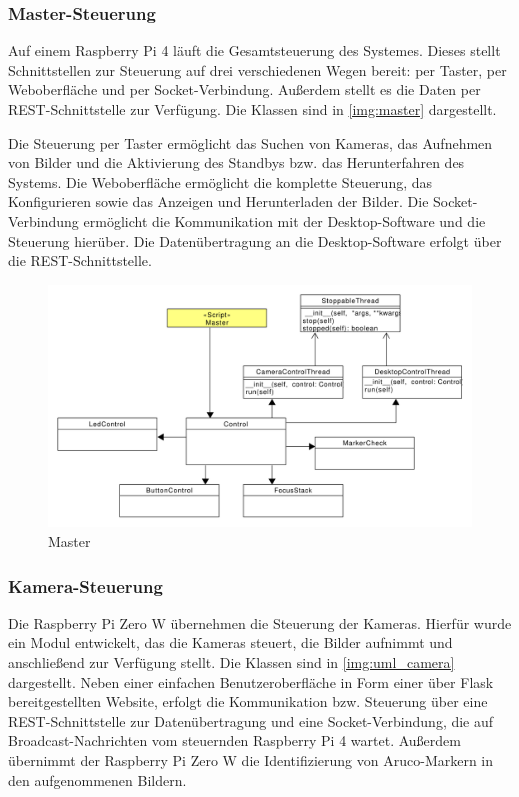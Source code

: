 \documentclass[./00PhotoBox.tex]{subfiles}
\begin{document}
\subsubsection{Master-Steuerung}

Auf einem Raspberry Pi 4 läuft die Gesamtsteuerung des Systemes. Dieses stellt Schnittstellen zur Steuerung auf drei verschiedenen Wegen bereit: per Taster, per Weboberfläche und per Socket-Verbindung. Außerdem stellt es die Daten per REST-Schnittstelle zur Verfügung. Die Klassen sind in \autoref{img:master} dargestellt.

Die Steuerung per Taster ermöglicht das Suchen von Kameras, das Aufnehmen von Bilder und die Aktivierung des Standbys bzw. das Herunterfahren des Systems. Die Weboberfläche ermöglicht die komplette Steuerung, das Konfigurieren sowie das Anzeigen und Herunterladen der Bilder. Die Socket-Verbindung ermöglicht die Kommunikation mit der Desktop-Software und die Steuerung hierüber. Die Datenübertragung an die Desktop-Software erfolgt über die REST-Schnittstelle.

\begin{figure}
    \centering
    \includegraphics[width=1\textwidth]{./img/uml/uml_master_classdiagramm.pdf}
    \centering
    \caption{Master} %
    \label{img:master} %
\end{figure}


\subsubsection{Kamera-Steuerung}
Die Raspberry Pi Zero W übernehmen die Steuerung der Kameras. Hierfür wurde ein Modul entwickelt, das die Kameras steuert, die Bilder aufnimmt und anschließend zur Verfügung stellt. Die Klassen sind in \autoref{img:uml_camera} dargestellt. Neben einer einfachen Benutzeroberfläche in Form einer über Flask bereitgestellten Website, erfolgt die Kommunikation bzw. Steuerung über eine REST-Schnittstelle zur Datenübertragung und eine Socket-Verbindung, die auf Broadcast-Nachrichten vom steuernden Raspberry Pi 4 wartet. Außerdem übernimmt der Raspberry Pi Zero W die Identifizierung von Aruco-Markern in den aufgenommenen Bildern.
\end{document}
